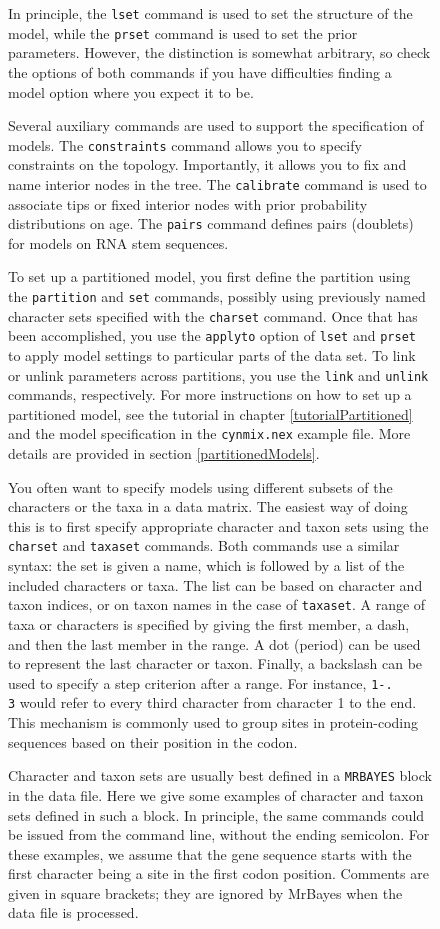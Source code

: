 \documentclass[12pt]{book}
\newcommand{\ttt}[1]{\texttt{#1}}
\begin{document}
\begin{figure}[h]
In principle, the \ttt{lset} command is used to set the structure of the model, while the
\ttt{prset} command is used to set the prior parameters. However, the distinction is somewhat
arbitrary, so check the options of both commands if you have difficulties finding a model option
where you expect it to be.

Several auxiliary commands are used to support the specification of models. The \ttt{constraints}
command allows you to specify constraints on the topology. Importantly, it allows you to fix and
name interior nodes in the tree. The \ttt{calibrate} command is used to associate tips or fixed
interior nodes with prior probability distributions on age. The \ttt{pairs} command defines pairs
(doublets) for models on RNA stem sequences.

To set up a partitioned model, you first define the partition using the \ttt{partition} and
\ttt{set} commands, possibly using previously named character sets specified with the \ttt{charset}
command. Once that has been accomplished, you use the \ttt{applyto} option of \ttt{lset} and
\ttt{prset} to apply model settings to particular parts of the data set. To link or unlink
parameters across partitions, you use the \ttt{link} and \ttt{unlink} commands, respectively. For
more instructions on how to set up a partitioned model, see the tutorial in chapter
\ref{tutorialPartitioned} and the model specification in the \ttt{cynmix.nex} example file. More
details are provided in section \ref{partitionedModels}.

You often want to specify models using different subsets of the characters or the taxa in a data
matrix. The easiest way of doing this is to first specify appropriate character and taxon sets
using the \ttt{charset} and \ttt{taxaset} commands. Both commands use a similar syntax: the set is
given a name, which is followed by a list of the included characters or taxa. The list can be based
on character and taxon indices, or on taxon names in the case of \ttt{taxaset}. A range of taxa or
characters is specified by giving the first member, a dash, and then the last member in the range.
A dot (period) can be used to represent the last character or taxon. Finally, a backslash can be
used to specify a step criterion after a range. For instance, \ttt{1-.\\3} would refer to every
third character from character 1 to the end. This mechanism is commonly used to group sites in
protein-coding sequences based on their position in the codon.

Character and taxon sets are usually best defined in a \ttt{MRBAYES} block in the data file. Here
we give some examples of character and taxon sets defined in such a block. In principle, the same
commands could be issued from the command line, without the ending semicolon. For these examples,
we assume that the gene sequence starts with the first character being a site in the first codon
position.  Comments are given in square brackets; they are ignored by MrBayes when the data file is
processed.


\end{figure}
\end{document}
